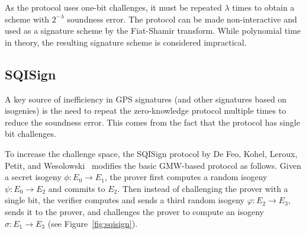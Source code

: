 As the protocol uses one-bit challenges, it must be repeated $\lambda$ times to obtain a scheme with $2^{-\lambda}$ soundness error.
The protocol can be made non-interactive and used as a signature scheme by the Fiat-Shamir transform. While polynomial time in theory, the resulting signature scheme is considered impractical.






\subsection{SQISign \label{sec:SQIsign}}

A key source of inefficiency in GPS signatures (and other signatures based on isogenies) is the need to repeat the zero-knowledge protocol multiple times to reduce the soundness error. This comes from the fact that the protocol has single bit challenges.


To increase the challenge space, the SQISign protocol by De Feo, Kohel, Leroux, Petit, and Wesolowski~\cite{DFKLPW20} modifies the basic GMW-based protocol as follows. Given a secret isogeny $\phi:E_0\rightarrow E_1$, the prover first computes a random isogeny $\psi:E_0\rightarrow E_2$ and commits to $E_2$. Then instead of challenging the prover with a single bit, the verifier computes and sends a third random isogeny $\varphi:E_2\rightarrow E_3$, sends it to the prover, and challenges the prover to compute an isogeny $\sigma:E_1\rightarrow E_3$ (see Figure~\ref{fig:sqisign}).

